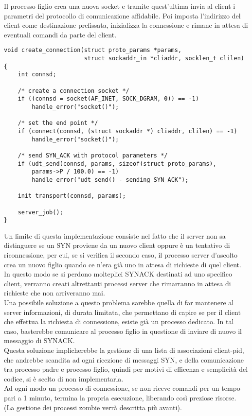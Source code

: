 Il processo figlio crea una nuova socket e tramite quest'ultima invia al client i parametri del protocollo di comunicazione affidabile.
Poi imposta l'indirizzo del client come destinazione prefissata, inizializza la connessione e rimane in attesa di eventuali comandi da parte del client.

\begin{lstlisting}[title=connessione del nuovo processo]
void create_connection(struct proto_params *params,
					   struct sockaddr_in *cliaddr, socklen_t clilen)
{
	int connsd;

	/* create a connection socket */
	if ((connsd = socket(AF_INET, SOCK_DGRAM, 0)) == -1)
		handle_error("socket()");

	/* set the end point */
	if (connect(connsd, (struct sockaddr *) cliaddr, clilen) == -1)
		handle_error("socket()");

	/* send SYN_ACK with protocol parameters */
	if (udt_send(connsd, params, sizeof(struct proto_params), 
		params->P / 100.0) == -1)
		handle_error("udt_send() - sending SYN_ACK");

	init_transport(connsd, params);

	server_job();
}
\end{lstlisting}


Un limite di questa implementazione consiste nel fatto che il server non sa distinguere se un SYN proviene da un nuovo client oppure è un tentativo di riconnessione, per cui, se si verifica il secondo caso, il processo server d'ascolto crea un nuovo figlio quando ce n'era già uno in attesa di richieste di quel client.
In questo modo se si perdono molteplici SYNACK destinati ad uno specifico client, verranno creati altrettanti processi server che rimarranno in attesa di richieste che non arriveranno mai.\\
Una possibile soluzione a questo problema sarebbe quella di far mantenere al server informazioni, di durata limitata, che permettano di capire se per il client che effettua la richiesta di connessione, esiste già un processo dedicato. In tal caso, basterebbe comunicare al processo figlio in questione di inviare di nuovo il messaggio di SYNACK.\\
Questa soluzione implicherebbe la gestione di una lista di associazioni client-pid, che andrebbe scandita ad ogni ricezione di messaggi SYN, e della comunicazione tra processo padre e processo figlio, quindi per motivi di efficenza e semplicità del codice, si è scelto di non implementarla.\\
Ad ogni modo un processo di connessione, se non riceve comandi per un tempo pari a 1 minuto, termina la propria esecuzione, liberando così preziose risorse.\\
(La gestione dei processi zombie verrà descritta più avanti).
